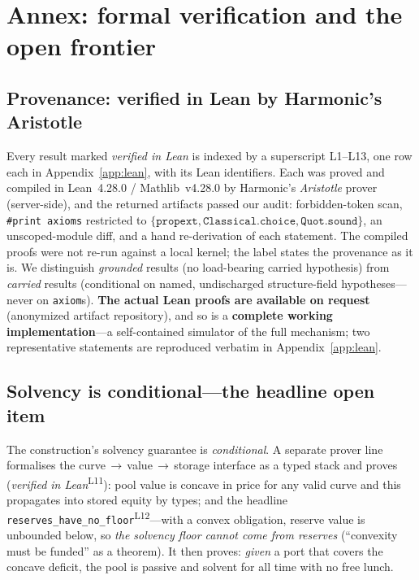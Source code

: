 \documentclass[runningheads]{llncs}
\newcommand{\tfp}{\emph{verified in Lean}}
\begin{document}
\section{Annex: formal verification and the open frontier}\label{sec:frontier}

\subsection{Provenance: verified in Lean by Harmonic's Aristotle}
Every result marked \emph{verified in Lean} is indexed by a superscript
L1--L13, one row each in Appendix~\ref{app:lean}, with its Lean identifiers.
Each was proved and compiled in Lean~4.28.0 / Mathlib~v4.28.0 by Harmonic's
\emph{Aristotle} prover (server-side), and the returned artifacts passed our
audit: forbidden-token scan, \texttt{\#print axioms} restricted to
$\{\texttt{propext},\texttt{Classical.choice},\texttt{Quot.sound}\}$, an
unscoped-module diff, and a hand re-derivation of each statement. The compiled
proofs were not re-run against a local kernel; the label states the provenance
as it is. We distinguish \emph{grounded} results (no load-bearing carried
hypothesis) from \emph{carried} results (conditional on named, undischarged
structure-field hypotheses---never on \texttt{axiom}s). \textbf{The actual
Lean proofs are available on request} (anonymized artifact repository), and so
is a \textbf{complete working implementation}---a self-contained simulator of
the full mechanism; two
representative statements are reproduced verbatim in
Appendix~\ref{app:lean}.

\subsection{Solvency is conditional---the headline open item}
The construction's solvency guarantee is \emph{conditional}. A separate prover
line formalises the curve\,$\to$\,value\,$\to$\,storage interface as a typed stack
and proves (\tfp{}\textsuperscript{L11}): pool value is concave in price
for any valid curve and this propagates into stored equity by types; and the
headline \texttt{reserves\_have\_no\_floor}\textsuperscript{L12}---with a convex
obligation, reserve value is unbounded below, so \emph{the solvency floor cannot
come from reserves} (``convexity must be funded'' as a theorem). It then proves:
\emph{given} a port that covers the concave deficit, the pool is passive and
solvent for all time with no free lunch.
\end{document}

